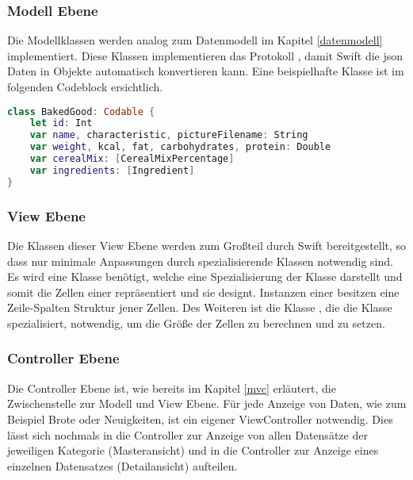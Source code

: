 \subsubsection{Modell Ebene}
Die Modellklassen werden analog zum Datenmodell im Kapitel \ref{datenmodell} implementiert.
Diese Klassen implementieren das Protokoll  , damit Swift die \gls{json} Daten in Objekte automatisch konvertieren kann. Eine beispielhafte Klasse ist im folgenden Codeblock ersichtlich.
\begin{lstlisting}[language=Swift]
class BakedGood: Codable {
    let id: Int
    var name, characteristic, pictureFilename: String
    var weight, kcal, fat, carbohydrates, protein: Double
    var cerealMix: [CerealMixPercentage]
    var ingredients: [Ingredient]
}
\end{lstlisting}

\clearpage

\subsubsection{View Ebene}
Die Klassen dieser View Ebene werden zum Großteil durch Swift bereitgestellt, so dass nur minimale Anpassungen durch spezialisierende Klassen notwendig sind.
Es wird eine Klasse  benötigt, welche eine Spezialisierung der Klasse  darstellt und somit die Zellen einer  repräsentiert und sie designt. Instanzen einer  besitzen eine Zeile-Spalten Struktur jener Zellen.
Des Weiteren ist die Klasse  , die die Klasse  spezialisiert, notwendig, um die Größe der Zellen zu berechnen und zu setzen.

\subsubsection{Controller Ebene}
Die Controller Ebene ist, wie bereits im Kapitel \ref{mvc} erläutert, die Zwischenstelle zur Modell und View Ebene.
Für jede Anzeige von Daten, wie zum Beispiel Brote oder Neuigkeiten, ist ein eigener ViewController notwendig.
Dies lässt sich nochmals in die Controller zur Anzeige von allen Datensätze der jeweiligen Kategorie (Masteransicht) und in die Controller zur Anzeige eines einzelnen Datensatzes (Detailansicht) aufteilen.

\clearpage

